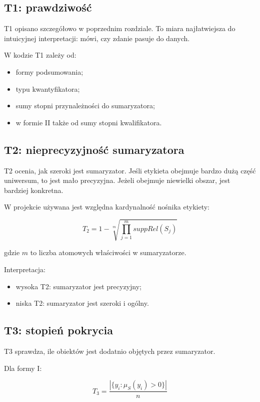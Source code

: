 \documentclass[11pt,a4paper]{article}
\begin{document}
\subsection{T1: prawdziwość}

T1 opisano szczegółowo w poprzednim rozdziale. To miara najłatwiejsza do intuicyjnej interpretacji: mówi, czy zdanie pasuje do danych.

W kodzie T1 zależy od:

\begin{itemize}
    \item formy podsumowania;
    \item typu kwantyfikatora;
    \item sumy stopni przynależności do sumaryzatora;
    \item w formie II także od sumy stopni kwalifikatora.
\end{itemize}

\subsection{T2: nieprecyzyjność sumaryzatora}

T2 ocenia, jak szeroki jest sumaryzator. Jeśli etykieta obejmuje bardzo dużą część uniwersum, to jest mało precyzyjna. Jeżeli obejmuje niewielki obszar, jest bardziej konkretna.

W projekcie używana jest względna kardynalność nośnika etykiety:

\[
T_2 = 1 - \sqrt[m]{\prod_{j=1}^{m} suppRel(S_j)}
\]

gdzie \(m\) to liczba atomowych właściwości w sumaryzatorze.

Interpretacja:

\begin{itemize}
    \item wysoka T2: sumaryzator jest precyzyjny;
    \item niska T2: sumaryzator jest szeroki i ogólny.
\end{itemize}

\subsection{T3: stopień pokrycia}

T3 sprawdza, ile obiektów jest dodatnio objętych przez sumaryzator.

Dla formy I:

\[
T_3 = \frac{|\{y_i : \mu_S(y_i)>0\}|}{n}
\]
\end{document}
